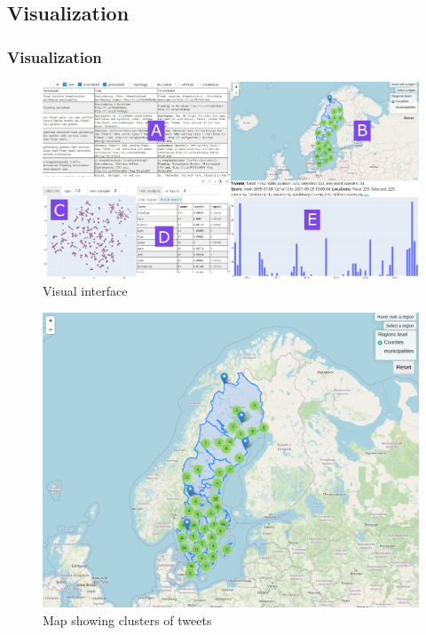 \documentclass{beamer}
\begin{document}
\subsection{Visualization}

\begin{frame}
  \frametitle{Visualization}
  \begin{figure}
    \includegraphics[width=\textwidth]{../report/images/visual_interface.png}
    \caption{Visual interface}
  \end{figure}
\end{frame}

\begin{frame}
  \begin{figure}
    \includegraphics[height=0.85\textheight]{../report/images/map.png}
    \caption{Map showing clusters of tweets}
  \end{figure}
\end{frame}
\end{document}
